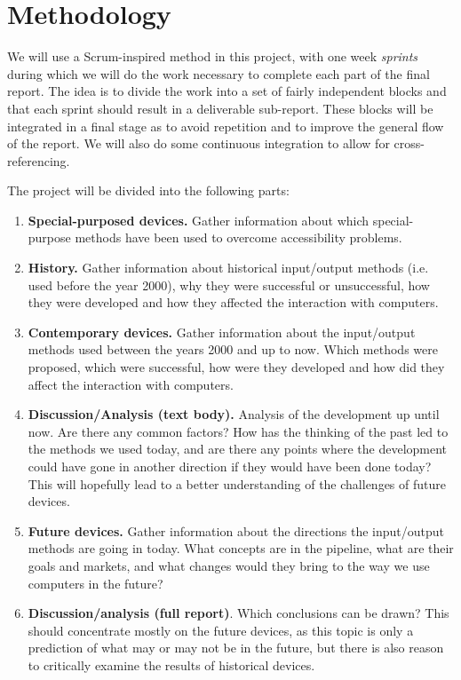\documentclass[a4paper,10pt]{article}
\begin{document}
\section{Methodology}
\label{sec:method}
We will use a Scrum-inspired\cite{scrum} method in this project, with one week \emph{sprints} during which we will do the work necessary to complete each part of the final report. The idea is to divide the work into a set of fairly independent blocks and that each sprint should result in a deliverable sub-report. These blocks will be integrated in a final stage as to avoid repetition and to improve the general flow of the report. We will also do some continuous integration to allow for cross-referencing.

The project will be divided into the following parts:
\begin{enumerate}
	\item \textbf{Special-purposed devices.} Gather information about which special-purpose methods have been used to overcome accessibility problems.
	\item \textbf{History.} Gather information about historical input/output methods (i.e. used before the year 2000), why they were successful or unsuccessful, how they were developed and how they affected the interaction with computers.
	\item \textbf{Contemporary devices.} Gather information about the input/output methods used between the years 2000 and up to now. Which methods were proposed, which were successful, how were they developed and how did they affect the interaction with computers.
	\item \textbf{Discussion/Analysis (text body).} Analysis of the development up until now. Are there any common factors? How has the thinking of the past led to the methods we used today, and are there any points where the development could have gone in another direction if they would have been done today? This will hopefully lead to a better understanding of the challenges of future devices.
	\item \textbf{Future devices.} Gather information about the directions the input/output methods are going in today. What concepts are in the pipeline, what are their goals and markets, and what changes would they bring to the way we use computers in the future?
	\item \textbf{Discussion/analysis (full report)}. Which conclusions can be drawn? This should concentrate mostly on the future devices, as this topic is only a prediction of what may or may not be in the future, but there is also reason to critically examine the results of historical devices.

\end{enumerate}
\end{document}
